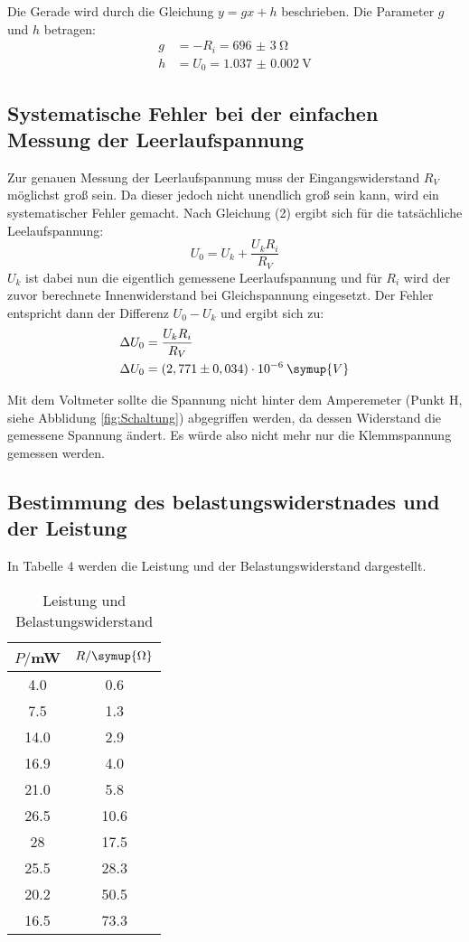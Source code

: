 Die Gerade wird durch die Gleichung $y = gx + h$ beschrieben. Die Parameter $g$ und $h$ betragen:
\begin{align*}
  g &= -R_i = \SI{696(3)}{\ohm}   \\
  h &= U_0 = \SI{1.037(2)}{\volt}
\end{align*}

\subsection{Systematische Fehler bei der einfachen Messung der Leerlaufspannung}
Zur genauen Messung der Leerlaufspannung muss der Eingangswiderstand $R_V$ möglichst groß sein.
Da dieser jedoch nicht unendlich groß sein kann, wird ein systematischer Fehler gemacht.
Nach Gleichung (2) ergibt sich für die tatsächliche Leelaufspannung:
\begin{equation*}
  U_0 = U_k + \frac{U_kR_i}{R_V}
\end{equation*}
$U_k$ ist dabei nun die eigentlich gemessene Leerlaufspannung und für $R_i$ wird
der zuvor berechnete Innenwiderstand bei Gleichspannung eingesetzt.
Der Fehler entspricht dann der Differenz $U_0 - U_k$ und ergibt sich zu:
\begin{align*}
  \Delta U_0 &= \frac{U_kR_i}{R_V} \\
  \Delta U_0 &= (2,771 \pm 0,034)\cdot 10^{-6} \: \symup{V}
\end{align*}

Mit dem Voltmeter sollte die Spannung nicht hinter dem Amperemeter (Punkt H, siehe Abblidung \ref{fig:Schaltung}) abgegriffen
werden, da dessen Widerstand die gemessene Spannung ändert. Es würde also nicht mehr nur die
Klemmspannung gemessen werden.




\subsection{Bestimmung des belastungswiderstnades und der Leistung}
In Tabelle 4 werden die Leistung und der Belastungswiderstand dargestellt.

\begin{table}[H]
  \centering
  \caption{Leistung und Belastungswiderstand}
  \label{tab:Leistung}
  \begin{tabular}{c c}
    \toprule
    $P/$mW & $R/ \symup{\Omega}$ \\
    \midrule
    4.0   &  0.6        \\
    7.5   &  1.3        \\
    14.0  &  2.9        \\
    16.9  &  4.0        \\
    21.0  &  5.8        \\
    26.5  &  10.6        \\
    28    &  17.5        \\
    25.5  &  28.3        \\
    20.2  &  50.5        \\
    16.5  &  73.3        \\
    \bottomrule
  \end{tabular}
\end{table}

